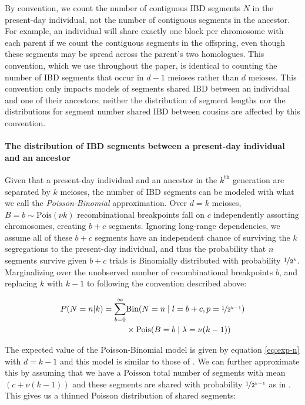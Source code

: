 \documentclass[9pt,twocolumn,twoside]{gsajnl}
\begin{document}
By convention, we count the number of contiguous IBD segments $N$ in the
present-day individual, not the number of contiguous segments in the ancestor.
For example, an individual will share exactly one block per chromosome with
each parent if we count the contiguous segments in the offspring, even though
these segments may be spread across the parent's two homologues. This
convention, which we use throughout the paper, is identical to counting the
number of IBD segments that occur in $d-1$ meioses rather than $d$ meioses.
This convention only impacts models of segments shared IBD between an
individual and one of their ancestors; neither the distribution of segment
lengths nor the distributions for segment number shared IBD between cousins are
affected by this convention.

\paragraph{The distribution of IBD segments between a present-day individual
and an ancestor} 
\label{sec:auto-dist-ibd-seg}

Given that a present-day individual and an ancestor in the $k^\text{th}$
generation are separated by $k$ meioses, the number of IBD segments can be
modeled with what we call the \emph{Poisson-Binomial} approximation. Over $d=k$
meioses, $B=b \sim \text{Pois}(\nu k)$ recombinational breakpoints fall on $c$
independently assorting chromosomes, creating $b + c$ segments. Ignoring
long-range dependencies, we assume all of these $b+c$ segments have an
independent chance of surviving the $k$ segregations to the present-day
individual, and thus the probability that $n$ segments survive given $b+c$
trials is Binomially distributed with probability $\nicefrac{1}{2^k}$.
Marginalizing over the unobserved number of recombinational breakpoints $b$,
and replacing $k$ with $k-1$ to following the convention described above:

\begin{align}
  P(N=n | k) = \sum_{b=0}^\infty &\text{Bin}(N=n \;|\; l=b+c,
p=\nicefrac{1}{2^{k-1}}) \\ \nonumber
&\times \text{Pois}(B=b \;|\; \lambda=\nu (k-1)) 
\end{align}

The expected value of the Poisson-Binomial model is given by equation
\eqref{eq:exp-n} with $d=k-1$ and this model is similar to those of
\citet{thomas:1994hg,Donnelly:1983fi}. We can further approximate this by
assuming that we have a Poisson total number of segments with mean $(c +
\nu(k-1))$ and these segments are shared with probability
$\nicefrac{1}{2^{k-1}}$ as in \citet{Huff:2011eg}. This gives us a
thinned Poisson distribution of shared segments:
\end{document}
